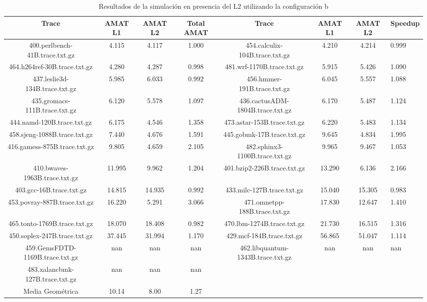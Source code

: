 \begin{table}[H]
\centering
\begin{tabular}{|c|c|c|c|c|c|c|}
\hline
Trace & AMAT L1 & AMAT L2 & Total AMAT & Trace & AMAT L1 & AMAT L2 & Speedup \\
\hline
400.perlbench-41B.trace.txt.gz & 4.115 & 4.117 & 1.000 & 454.calculix-104B.trace.txt.gz & 4.210 & 4.214 & 0.999 \\\hline
464.h264ref-30B.trace.txt.gz & 4.280 & 4.287 & 0.998 & 481.wrf-1170B.trace.txt.gz & 5.915 & 5.426 & 1.090 \\\hline
437.leslie3d-134B.trace.txt.gz & 5.985 & 6.033 & 0.992 & 456.hmmer-191B.trace.txt.gz & 6.045 & 5.557 & 1.088 \\\hline
435.gromacs-111B.trace.txt.gz & 6.120 & 5.578 & 1.097 & 436.cactusADM-1804B.trace.txt.gz & 6.170 & 5.487 & 1.124 \\\hline
444.namd-120B.trace.txt.gz & 6.175 & 4.546 & 1.358 & 473.astar-153B.trace.txt.gz & 6.220 & 5.483 & 1.134 \\\hline
458.sjeng-1088B.trace.txt.gz & 7.440 & 4.676 & 1.591 & 445.gobmk-17B.trace.txt.gz & 9.645 & 4.834 & 1.995 \\\hline
416.gamess-875B.trace.txt.gz & 9.805 & 4.659 & 2.105 & 482.sphinx3-1100B.trace.txt.gz & 9.965 & 9.467 & 1.053 \\\hline
410.bwaves-1963B.trace.txt.gz & 11.995 & 9.962 & 1.204 & 401.bzip2-226B.trace.txt.gz & 13.290 & 6.136 & 2.166 \\\hline
403.gcc-16B.trace.txt.gz & 14.815 & 14.935 & 0.992 & 433.milc-127B.trace.txt.gz & 15.040 & 15.305 & 0.983 \\\hline
453.povray-887B.trace.txt.gz & 16.220 & 5.291 & 3.066 & 471.omnetpp-188B.trace.txt.gz & 17.830 & 12.647 & 1.410 \\\hline
465.tonto-1769B.trace.txt.gz & 18.070 & 18.408 & 0.982 & 470.lbm-1274B.trace.txt.gz & 21.730 & 16.515 & 1.316 \\\hline
450.soplex-247B.trace.txt.gz & 37.445 & 31.994 & 1.170 & 429.mcf-184B.trace.txt.gz & 56.865 & 51.047 & 1.114 \\\hline
459.GemsFDTD-1169B.trace.txt.gz & nan & nan & nan & 462.libquantum-1343B.trace.txt.gz & nan & nan & nan \\\hline
483.xalancbmk-127B.trace.txt.gz & nan & nan & nan &  &  &  &  \\\hline
Media Geométrica & 10.14 & 8.00&1.27 & & & &\\\hline
\end{tabular}
\caption{Resultados de la simulación en presencia del L2 utilizando la configuración b}
\label{tab:amatL1}
\end{table}
